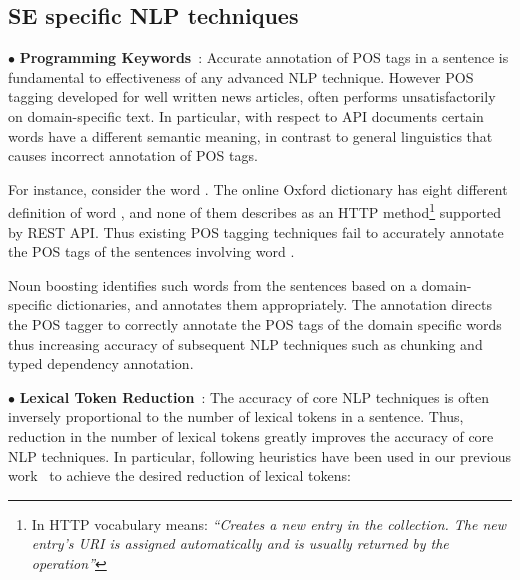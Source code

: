 

\subsection{SE specific NLP techniques}
\label{sub:SENLPback}

{\small $\bullet$} \textbf{Programming Keywords}~\cite{pandita12:inferring}: Accurate annotation of POS tags in a sentence is fundamental to effectiveness of any advanced NLP technique.
However POS tagging developed for well written news articles, often performs unsatisfactorily on domain-specific text.
In particular, with respect to API documents certain words have a different semantic meaning, in contrast to general linguistics that causes incorrect annotation of POS tags.

For instance, consider the word . 
The online Oxford dictionary %
has eight different definition of word , and none of them describes  as an HTTP method\footnote{In HTTP vocabulary  means: \textit{``Creates a new entry in the collection.
The new entry's URI is assigned automatically and is usually returned by the operation''}}
supported by REST API.
Thus existing POS tagging techniques fail to accurately annotate the POS tags of the sentences involving word . 

Noun boosting identifies such words from the sentences based on a domain-specific dictionaries, and annotates them appropriately.
The annotation directs the POS tagger to correctly annotate the POS tags of the domain specific words thus increasing accuracy of subsequent NLP techniques such as chunking and typed dependency annotation.

{\small $\bullet$} \textbf{Lexical Token Reduction}~\cite{pandita13:WHYPER}:
The accuracy of core NLP techniques is often inversely proportional to the number of lexical tokens in a sentence.
Thus, reduction in the number of lexical tokens greatly improves the accuracy of core NLP techniques. 
In particular, following heuristics have been used in our previous work~\cite{pandita12:inferring,pandita13:WHYPER} to achieve the desired reduction of lexical tokens:

